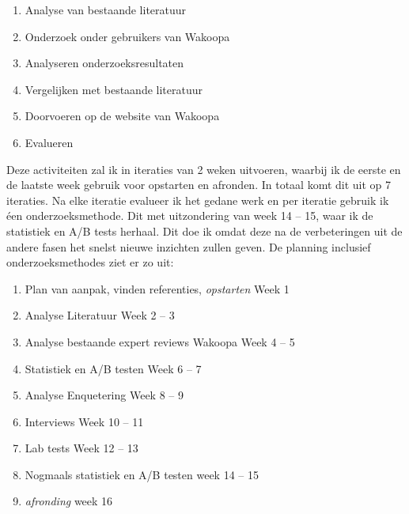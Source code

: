 \documentclass[a4paper, 10pt, pdftex]{article}
\begin{document}
\begin{enumerate}
\item
Analyse van bestaande literatuur
\item
Onderzoek onder gebruikers van Wakoopa
\item
Analyseren onderzoeksresultaten
\item
Vergelijken met bestaande literatuur
\item
Doorvoeren op de website van Wakoopa
\item
Evalueren
\end{enumerate}

Deze activiteiten zal ik in iteraties van 2 weken uitvoeren, waarbij ik de eerste en de laatste week gebruik voor opstarten en afronden. In totaal komt dit uit op 7 iteraties. Na elke iteratie evalueer ik het gedane werk en per iteratie gebruik ik éen onderzoeksmethode. Dit met uitzondering van week 14 -- 15, waar ik de statistiek en A/B tests herhaal. Dit doe ik omdat deze na de verbeteringen uit de andere fasen het snelst nieuwe inzichten zullen geven. De planning inclusief onderzoeksmethodes ziet er zo uit:

\begin{flushleft}
  \begin{enumerate}
    \item Plan van aanpak, vinden referenties, \emph{opstarten}
      \linebreak Week 1
    \item Analyse Literatuur
      \linebreak Week 2 -- 3
    \item Analyse bestaande expert reviews Wakoopa
      \linebreak Week 4 -- 5
    \item Statistiek en A/B testen
      \linebreak Week 6 -- 7
    \item Analyse Enquetering
      \linebreak Week 8 -- 9
    \item Interviews
      \linebreak Week 10 -- 11
    \item Lab tests
      \linebreak Week 12 -- 13
    \item Nogmaals statistiek en A/B testen
      \linebreak week 14 -- 15
    \item \emph{afronding}
      \linebreak week 16
  \end{enumerate}
\end{flushleft}
\end{document}

